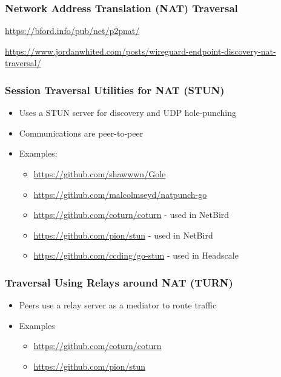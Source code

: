 \hypertarget{notes__02021-internet-protocol.md__network-address-translation-nat-traversal}{%
\subsubsection{Network Address Translation (NAT)
Traversal}\label{notes__02021-internet-protocol.md__network-address-translation-nat-traversal}}

\url{https://bford.info/pub/net/p2pnat/}

\url{https://www.jordanwhited.com/posts/wireguard-endpoint-discovery-nat-traversal/}

\hypertarget{notes__02021-internet-protocol.md__session-traversal-utilities-for-nat-stun}{%
\subsubsection{Session Traversal Utilities for NAT
(STUN)}\label{notes__02021-internet-protocol.md__session-traversal-utilities-for-nat-stun}}

\begin{itemize}
\item
  Uses a STUN server for discovery and UDP hole-punching
\item
  Communications are peer-to-peer
\item
  Examples:

  \begin{itemize}
  \item
    \url{https://github.com/shawwwn/Gole}
  \item
    \url{https://github.com/malcolmseyd/natpunch-go}
  \item
    \url{https://github.com/coturn/coturn} - used in NetBird
  \item
    \url{https://github.com/pion/stun} - used in NetBird
  \item
    \url{https://github.com/ccding/go-stun} - used in Headscale
  \end{itemize}
\end{itemize}

\hypertarget{notes__02021-internet-protocol.md__traversal-using-relays-around-nat-turn}{%
\subsubsection{Traversal Using Relays around NAT
(TURN)}\label{notes__02021-internet-protocol.md__traversal-using-relays-around-nat-turn}}

\begin{itemize}
\item
  Peers use a relay server as a mediator to route traffic
\item
  Examples

  \begin{itemize}
  \item
    \url{https://github.com/coturn/coturn}
  \item
    \url{https://github.com/pion/stun}
  \end{itemize}
\end{itemize}

